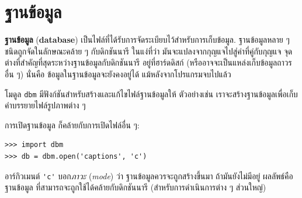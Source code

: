 \section{ฐานข้อมูล}


\textbf{ฐานข้อมูล} (\textbf{database}) เป็นไฟล์ที่ได้รับการจัดระเบียบไว้สำหรับการเก็บข้อมูล.
ฐานข้อมูลหลาย ๆ ชนิดถูกจัดในลักษณะคล้าย ๆ กับดิกชันนารี
ในแง่ที่ว่า มันจะแปลงจากกุญแจไปสู่ค่าที่คู่กับกุญแจ
จุดต่างที่สำคัญที่สุดระหว่างฐานข้อมูลกับดิกชันนารี
อยู่ที่ฮาร์ดดิสก์ (หรืออาจจะเป็นแหล่งเก็บข้อมูลถาวรอื่น ๆ)
นั่นคือ ข้อมูลในฐานข้อมูลจะยังคงอยู่ได้ แม้หลังจากโปรแกรมจบไปแล้ว


โมดูล \texttt{dbm} มีฟังก์ชันสำหรับสร้างและแก้ไขไฟล์ฐานข้อมูลให้
ตัวอย่างเช่น เราจะสร้างฐานข้อมูลเพื่อเก็บคำบรรยายไฟล์รูปภาพต่าง ๆ

การเปิดฐานข้อมูล ก็คล้ายกับการเปิดไฟล์อื่น ๆ:

\begin{verbatim}
>>> import dbm
>>> db = dbm.open('captions', 'c')
\end{verbatim}
%
%
อาร์กิวเมนต์ \verb|'c'| บอก\textit{ภาวะ} (\textit{mode}) ว่า
ฐานข้อมูลควรจะถูกสร้างขึ้นมา ถ้ามันยังไม่มีอยู่
ผลลัพธ์คือ ฐานข้อมูล ที่สามารถจะถูกใช้ได้คล้ายกับดิกชันนารี (สำหรับการดำเนินการต่าง ๆ ส่วนใหญ่)

